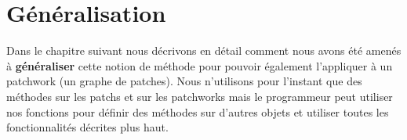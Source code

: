\section{G\'en\'eralisation}

Dans le chapitre suivant nous d\'ecrivons en d\'etail 
comment nous avons \'et\'e amen\'es \`a {\bf g\'en\'eraliser}
cette notion de m\'ethode pour pouvoir
\'egalement l'appliquer \`a un patchwork (un graphe de patches).
Nous n'utilisons pour l'instant que des m\'ethodes sur les patchs et sur
les patchworks mais le programmeur peut utiliser nos fonctions pour
d\'efinir des m\'ethodes sur d'autres objets et utiliser toutes les
fonctionnalit\'es d\'ecrites plus haut.

